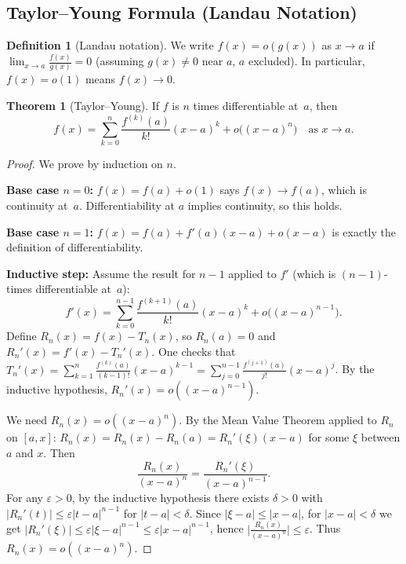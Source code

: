 \documentclass[12pt,a4paper,openany]{book}
\theoremstyle{definition}
\newtheorem{definition}{Definition}[chapter]
\newtheorem{theorem}{Theorem}[chapter]
\theoremstyle{remark}
\begin{document}
\subsection{Taylor--Young Formula (Landau Notation)}

\begin{definition}[Landau notation]\label{def:landau}
We write $f(x)=o(g(x))$ as $x\to a$ if
$\lim_{x\to a}\frac{f(x)}{g(x)}=0$ (assuming $g(x)\neq 0$ near $a$,
$a$ excluded).  In particular, $f(x)=o(1)$ means $f(x)\to 0$.
\end{definition}

\begin{theorem}[Taylor--Young]\label{thm:taylor-young}
If $f$ is $n$ times differentiable at~$a$, then
\[
  f(x) = \sum_{k=0}^{n}\frac{f^{(k)}(a)}{k!}(x-a)^k
  + o\bigl((x-a)^n\bigr)
  \quad\text{as } x\to a.
\]
\end{theorem}

\begin{proof}
We prove by induction on $n$.

\textbf{Base case $n=0$:}\; $f(x)=f(a)+o(1)$ says $f(x)\to f(a)$,
which is continuity at~$a$.  Differentiability at $a$ implies
continuity, so this holds.

\textbf{Base case $n=1$:}\; $f(x)=f(a)+f'(a)(x-a)+o(x-a)$ is
exactly the definition of differentiability.

\textbf{Inductive step:}\; Assume the result for $n-1$ applied to
$f'$ (which is $(n-1)$-times differentiable at~$a$):
\[
  f'(x) = \sum_{k=0}^{n-1}\frac{f^{(k+1)}(a)}{k!}(x-a)^k
  + o\bigl((x-a)^{n-1}\bigr).
\]
Define $R_n(x)=f(x)-T_n(x)$, so $R_n(a)=0$ and
$R_n'(x)=f'(x)-T_n'(x)$.  One checks that
$T_n'(x)=\sum_{k=1}^{n}\frac{f^{(k)}(a)}{(k-1)!}(x-a)^{k-1}
=\sum_{j=0}^{n-1}\frac{f^{(j+1)}(a)}{j!}(x-a)^j$.
By the inductive hypothesis, $R_n'(x)=o((x-a)^{n-1})$.

We need $R_n(x)=o((x-a)^n)$.  By the Mean Value Theorem applied to
$R_n$ on $[a,x]$: $R_n(x)=R_n(x)-R_n(a)=R_n'(\xi)(x-a)$ for some
$\xi$ between $a$ and $x$.  Then
\[
  \frac{R_n(x)}{(x-a)^n}
  = \frac{R_n'(\xi)}{(x-a)^{n-1}}.
\]
For any $\varepsilon>0$, by the inductive hypothesis there exists
$\delta>0$ with $|R_n'(t)|\le\varepsilon|t-a|^{n-1}$ for $|t-a|<\delta$.
Since $|\xi-a|\le|x-a|$, for $|x-a|<\delta$ we get
$|R_n'(\xi)|\le\varepsilon|\xi-a|^{n-1}\le\varepsilon|x-a|^{n-1}$,
hence $\bigl|\frac{R_n(x)}{(x-a)^n}\bigr|\le\varepsilon$.
Thus $R_n(x)=o((x-a)^n)$.
\end{proof}
\end{document}

